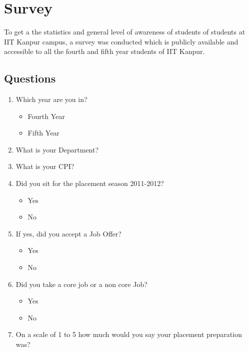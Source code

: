 \documentclass[a4paper,12pt]{report}
\begin{document}
\chapter{Survey}
To get a the statistics and general level of awareness of students of students at IIT Kanpur campus, a
survey was conducted which is publicly available and accessible to all the fourth and fifth year 
students of IIT Kanpur.
\section{Questions}
\begin{enumerate}
 \item Which year are you in?
  \begin{multicols}{2}
  \begin{itemize}
   \item Fourth Year
   \item Fifth Year
  \end{itemize}
  \end{multicols}
 \item What is your Department?
 \item What is your CPI?
 \item Did you sit for the placement season 2011-2012?
  \begin{multicols}{2}
  \begin{itemize}
   \item Yes
   \item No
  \end{itemize}
  \end{multicols}
 \item If yes, did you accept a Job Offer?
  \begin{multicols}{2}
  \begin{itemize}
   \item Yes
   \item No
  \end{itemize}
  \end{multicols}
 \item Did you take a core job or a non core Job?
  \begin{multicols}{2}
  \begin{itemize}
   \item Yes
   \item No
  \end{itemize}
  \end{multicols}
 \item On a scale of 1 to 5 how much would you say your placement preparation was?

\end{enumerate}
\end{document}

